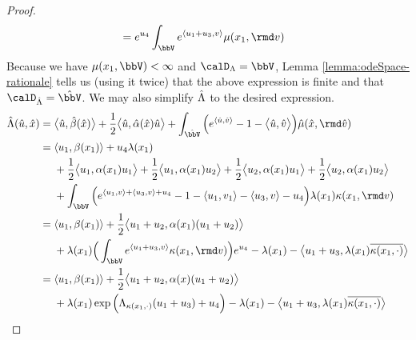 \begin{proof}
\begin{align*}
    &= e^{\momentVar_4} \int_\vecSpace e^{\prj{\momentVar_1+\momentVar_3}{\markVar}} \affJump(\stateVar_1, \rmd\markVar)
  \end{align*}
  Because we have $\affJump(\stateVar_1, \vecSpace) < \infty$ and $\odeSpace = \vecSpace$, Lemma \ref{lemma:odeSpace-rationale} tells us (using it twice) that the above expression is finite and that $\odeSpaceJoint = \hat\vecSpace$.
  We may also simplify $\hat{\Lambda}$ to the desired expression.
  \begin{align*}
    \hat\ode(\hat\momentVar, \hat\stateVar) 
    &= \bprj{\hat\momentVar}{\hat\affDrift(\hat\stateVar)} + \frac12\bprj{\hat\momentVar}{\hat\affDiff(\hat\stateVar)\hat\momentVar} + \int_{\hat\vecSpace} \Big( e^\prj{\hat\momentVar}{\hat\markVar} - 1 - \bprj{\hat\momentVar}{\hat\markVar} \Big) \hat\affJump(\hat\stateVar, \rmd\hat\markVar) \\
    &= \begin{aligned}[t]
      &\prj{\momentVar_1}{\affDrift(\stateVar_1)} + \momentVar_4\affInt(\stateVar_1) \\
      &+ \frac12\bprj{\momentVar_1}{\affDiff(\stateVar_1)\momentVar_1}  + \frac12\bprj{\momentVar_1}{\affDiff(\stateVar_1)\momentVar_2}  + \frac12\bprj{\momentVar_2}{\affDiff(\stateVar_1)\momentVar_1}+ \frac12\bprj{\momentVar_2}{\affDiff(\stateVar_1)\momentVar_2}\\
      &+ \int_\vecSpace \Big( e^{\prj{\momentVar_1}{\markVar} + \prj{\momentVar_3}{\markVar} + \momentVar_4} - 1 - \prj{\momentVar_1}{\markVar_1} - \prj{\momentVar_3}{\markVar} - \momentVar_4  \Big) \affInt(\stateVar_1) \affDist(\stateVar_1, \rmd\markVar)
    \end{aligned} \\
    &= \begin{aligned}[t]
      &\prj{\momentVar_1}{\affDrift(\stateVar_1)} + \frac12\bprj{\momentVar_1+\momentVar_2}{\affDiff(\stateVar_1)(\momentVar_1+\momentVar_2)}  \\
      &+ \affInt(\stateVar_1)\Big(\int_\vecSpace e^\prj{\momentVar_1+\momentVar_3}{\markVar} \affDist(\stateVar_1, \rmd\markVar) \Big) e^{\momentVar_4} - \affInt(\stateVar_1) - \bprj{\momentVar_1 + \momentVar_3}{\affInt(\stateVar_1)\overline{\affDist(\stateVar_1,\cdot)}}
    \end{aligned} \\
    &= \begin{aligned}[t]
      &\prj{\momentVar_1}{\affDrift(\stateVar_1)} + \frac12\bprj{\momentVar_1+\momentVar_2}{\affDiff(\stateVar)(\momentVar_1+\momentVar_2)} \\
      &+ \affInt(\stateVar_1)\exp\Big(\ode_{\affDist(\stateVar_1,\cdot)}(\momentVar_1+\momentVar_3) + \momentVar_4\Big) - \affInt(\stateVar_1) -  \bprj{\momentVar_1+\momentVar_3}{\affInt(\stateVar_1)\overline{\affDist(\stateVar_1,\cdot)}} 
    \end{aligned}
  \end{align*}
\end{proof}
